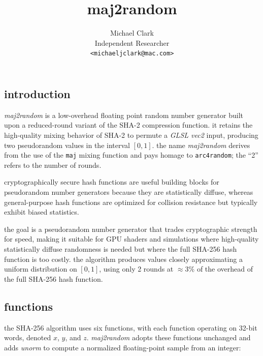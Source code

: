 \documentclass{scrartcl}
\title{maj2random}
\author{\small Michael Clark \\ \small Independent Researcher \\ \small \texttt{<michaeljclark@mac.com>}}
\date{}
\begin{document}
\maketitle

\subsection*{introduction}

\noindent
\emph{maj2random} is a low-overhead floating point random number generator
built upon a reduced-round variant of the SHA-2 compression function. it
retains the high-quality mixing behavior of SHA-2 to permute a \emph{GLSL
vec2} input, producing two pseudorandom values in the interval $[0,1]$.
the name \emph{maj2random} derives from the use of the \texttt{maj} mixing
function and pays homage to \texttt{arc4random}; the “2” refers to the number
of rounds.
\\
\par\noindent
cryptographically secure hash functions are useful building blocks for
pseudorandom number generators because they are statistically diffuse,
whereas general-purpose hash functions are optimized for collision
resistance but typically exhibit biased statistics.
\\
\par\noindent
the goal is a pseudorandom number generator that trades cryptographic
strength for speed, making it suitable for GPU shaders and simulations where
high-quality statistically diffuse randomness is needed but where the full
SHA-256 hash function is too costly. the algorithm produces values
closely approximating a uniform distribution on $[0,1]$, using only 2 rounds
at $\approx 3\%$ of the overhead of the full SHA-256 hash function.

\subsection*{functions}

\noindent
the SHA-256 algorithm uses six functions, with each function
operating on 32-bit words, denoted \(x\), \(y\), and \(z\).
\textit{maj2random} adopts these functions unchanged and adds \emph{unorm}
to compute a normalized floating-point sample from an integer:
\end{document}
